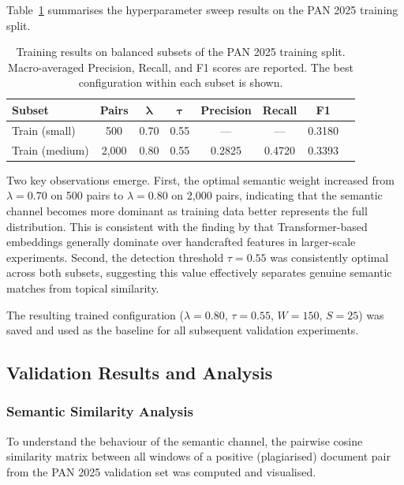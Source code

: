 \documentclass[12pt, a4paper]{article}
\begin{document}
Table~\ref{tab:training} summarises the hyperparameter sweep results on the PAN 2025 training split.

\begin{table}[htbp]
	\centering
	\caption{Training results on balanced subsets of the PAN 2025 training split. Macro-averaged Precision, Recall, and F1 scores are reported. The best configuration within each subset is shown.}
	\label{tab:training}
	\begin{tabular}{lccccccc}
		\toprule
		\textbf{Subset} & \textbf{Pairs} & $\boldsymbol{\lambda}$ & $\boldsymbol{\tau}$ & \textbf{Precision} & \textbf{Recall} & \textbf{F1} \\
		\midrule
		Train (small)  & 500   & 0.70 & 0.55 & ---   & ---   & 0.3180 \\
		Train (medium) & 2{,}000 & 0.80 & 0.55 & 0.2825 & 0.4720 & 0.3393 \\
		\bottomrule
	\end{tabular}
\end{table}

Two key observations emerge. First, the optimal semantic weight increased from $\lambda = 0.70$ on 500 pairs to $\lambda = 0.80$ on 2,000 pairs, indicating that the semantic channel becomes more dominant as training data better represents the full distribution. This is consistent with the finding by \citet{Asalkar2025} that Transformer-based embeddings generally dominate over handcrafted features in larger-scale experiments. Second, the detection threshold $\tau = 0.55$ was consistently optimal across both subsets, suggesting this value effectively separates genuine semantic matches from topical similarity.

The resulting trained configuration ($\lambda = 0.80$, $\tau = 0.55$, $W = 150$, $S = 25$) was saved and used as the baseline for all subsequent validation experiments.

\subsection{Validation Results and Analysis}

\subsubsection{Semantic Similarity Analysis}

To understand the behaviour of the semantic channel, the pairwise cosine similarity matrix between all windows of a positive (plagiarised) document pair from the PAN 2025 validation set was computed and visualised.
\end{document}

